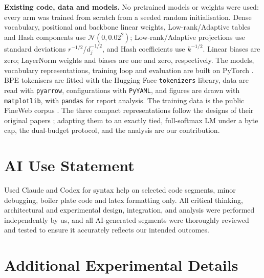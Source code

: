 \documentclass[10pt,a4paper]{article}
\newcommand{\TODO}[1]{\textcolor{red}{[#1]}}
\begin{document}
\textbf{Existing code, data and models.} No pretrained models or weights were used: every arm was
trained from scratch from a seeded random initialisation. Dense vocabulary, positional and backbone linear weights,
Low-rank/Adaptive tables and Hash components use $\mathcal{N}(0,0.02^2)$; Low-rank/Adaptive projections use
standard deviations $r^{-1/2}$/$d_j^{-1/2}$, and Hash coefficients use $k^{-1/2}$. Linear biases are zero;
LayerNorm weights and biases are one and zero, respectively. The models,
vocabulary representations, training loop and evaluation are built on PyTorch
\citep{paszke2019pytorch}. BPE tokenisers are fitted with the Hugging Face \texttt{tokenizers} library,
data are read with \texttt{pyarrow}, configurations with \texttt{PyYAML}, and figures are drawn with
\texttt{matplotlib}, with \texttt{pandas} for report analysis. The training data is the public FineWeb corpus \citep{penedo2024fineweb}. The three
compact representations follow the designs of their original papers \citep{lan2020albert,
baevski2019adaptive,svenstrup2017hash}; adapting them to an exactly tied, full-softmax LM under a byte
cap, the dual-budget protocol, and the analysis are our contribution.

\section*{AI Use Statement}
Used Claude and Codex for syntax help on selected code segments, minor debugging, boiler plate code and latex
formatting only. All critical thinking, architectural and experimental design, integration,
and analysis were performed independently by us, and all AI-generated segments were thoroughly
reviewed and tested to ensure it accurately reflects our intended outcomes.

\clearpage



\clearpage
\appendix
\section{Additional Experimental Details}
\label{app:details}
\end{document}
